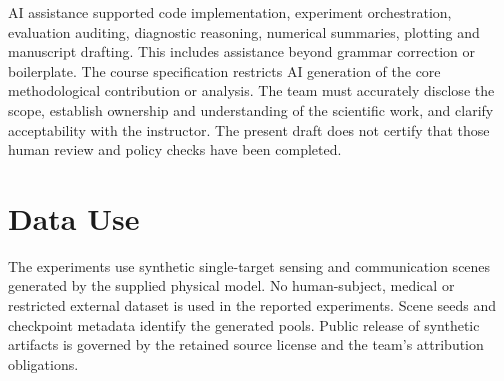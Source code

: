 \documentclass[conference]{IEEEtran}
\begin{document}
AI assistance supported code implementation, experiment orchestration, evaluation auditing, diagnostic reasoning, numerical summaries, plotting and manuscript drafting. This includes assistance beyond grammar correction or boilerplate. The course specification restricts AI generation of the core methodological contribution or analysis. The team must accurately disclose the scope, establish ownership and understanding of the scientific work, and clarify acceptability with the instructor. The present draft does not certify that those human review and policy checks have been completed.

\section{Data Use}
The experiments use synthetic single-target sensing and communication scenes generated by the supplied physical model. No human-subject, medical or restricted external dataset is used in the reported experiments. Scene seeds and checkpoint metadata identify the generated pools. Public release of synthetic artifacts is governed by the retained source license and the team's attribution obligations.

\clearpage\raggedbottom
\end{document}
